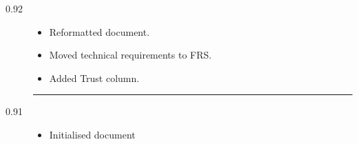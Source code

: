 \documentclass[a4paper, 10pt]{article}
\begin{document}
\begin{description}
                                                                                                                                                                \item [0.92] \begin{itemize}
                                                                                                                                                                                    \renewcommand\labelitemi{--}
                                                                                                                                                                                            \item Reformatted document.
                                                                                                                                                                                                        \item Moved technical requirements to FRS.
                                                                                                                                                                                                                    \item Added Trust column.
                                                                                                                                                                                                                            \end{itemize}
                                                                                                                                                                                                                                \rule{\textwidth}{1pt}
                                                                                                                                                                                                                                    \item [0.91] \begin{itemize}
                                                                                                                                                                                                                                                        \renewcommand\labelitemi{--}
                                                                                                                                                                                                                                                                \item Initialised document
                                                                                                                                                                                                                                                                        \end{itemize}
\end{description}
\end{document}
